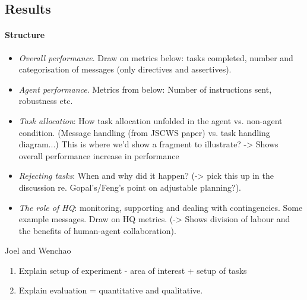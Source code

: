 \subsection{Results}

\paragraph{Structure}
\begin{itemize}
\item  \textit{Overall performance}. Draw on metrics below: tasks completed, number and categorisation of messages (only directives and assertives). 
\item \textit{Agent performance}. Metrics from below: Number of instructions sent, robustness etc. 
\item \textit{Task allocation}: How task allocation unfolded in the agent vs. non-agent condition. (Message handling (from JSCWS paper) vs. task handling diagram...) This is where we'd show a fragment to illustrate? -> Shows overall performance increase in performance
\item \textit{Rejecting tasks}: When and why did it happen? (-> pick this up in the discussion re. Gopal's/Feng's point on adjustable planning?). 
\item \textit{The role of HQ}: monitoring, supporting and dealing with contingencies. Some example messages. Draw on HQ metrics. (-> Shows division of labour and the benefits of human-agent collaboration).
\end{itemize} 
 
Joel and Wenchao
\begin{enumerate}
\item Explain setup of experiment - area of interest + setup of tasks
\item Explain evaluation = quantitative and qualitative.
\end{enumerate}
